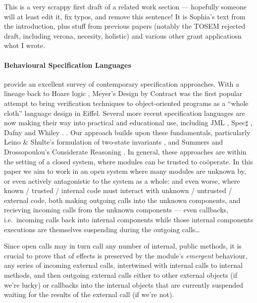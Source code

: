         
This is a very scrappy first draft of a related work section ---
hopefully someone will at least edit it, fix typos, and remove this
sentence! It is Sophia's text from the introduction, plus stuff from
previous papers (notably the TOSEM rejected draft, including verona,
necesity, holistic) and various other grant applicatiosn whot I wrote.


\paragraph{Behavioural Specification Languages} 

\citet{behavSurvey2012} provide an excellent survey of
contemporary specification approaches.  With a lineage back to Hoare
logic \cite{Hoare69}, Meyer's Design by Contract \cite{Meyer97} was the
first popular attempt to bring verification techniques to
object-oriented programs as a ``whole cloth'' language design in
Eiffel.  Several more recent specification languages are now making
their way into practical and educational use, including JML
\cite{Leavens-etal07}, Spec$\sharp$ \cite{BarLeiSch05}, Dafny
\cite{dafny} and Whiley \cite{whiley15}.
. Our approach builds upon
these fundamentals, particularly Leino \& Shulte's
formulation of
two-state invariants \cite{usingHistory}, and Summers and
Drossopoulou's Considerate Reasoning \cite{considerate}.
%
In general, these approaches are within the setting of a closed
system, where modules can be trusted to co{\"o}perate. In this paper
we aim to
work
in an open system where many modules are unknown by, or even actively
antagonistic to the system as a whole: and even worse, where
known / trusted / internal code must interact with unknown / untrusted
/ external code, both making outgoing calls into the unknown components,
and recieving incoming calls from the unknown components --- even
callbacks, i.e.\ incoming calls back into internal components while
those internal components executions are themselves suspending during
the outgoing calls\ldots

Since open calls may in turn call any number of internal, public
methods, it is crucial to prove that \taming of effects is preserved
by the module's \emph{emergent} behaviour, \ie any series of incoming
external calls, intertwined with internal calls to internal methods,
and then outgoing external calls either to other external objects (if
we're lucky) or callbacks into the internal objects that are currently
suspended waiting for the results of the external call (if we're not).

